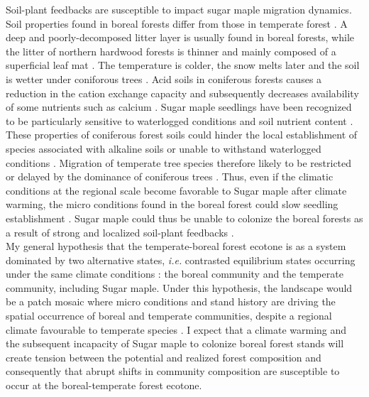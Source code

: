 Soil-plant feedbacks are susceptible to impact sugar maple migration dynamics.
Soil properties found in boreal forests differ from those in temperate forest
\cite{Lafleur2010,Barras1998,Goldblum2010,Demers1998}. A deep and poorly-decomposed
 litter layer is usually found in boreal forests, while the litter
of  northern hardwood forests is thinner and mainly composed of a superficial
leaf mat \cite{Barras1998}. The temperature is colder, the snow melts later
and the soil is wetter under coniforous trees \cite{Lafleur2010,Goldblum2010}.
Acid soils in coniferous forests causes a reduction in the cation exchange
capacity and subsequently decreases availability of some nutrients such as
calcium \cite{Moore2008}. Sugar maple seedlings have been recognized to be
particularly sensitive to waterlogged conditions and soil nutrient content
\cite{Moore2008,Lafleur2010,Cleavitt2011}. These properties of coniferous
forest soils could hinder the local establishment of species associated with
alkaline soils or unable to withstand waterlogged conditions
\cite{Lafleur2010}. Migration of temperate tree species therefore likely to be
restricted or delayed by the dominance of coniferous trees \cite{Lafleur2010}.
Thus, even if the climatic conditions at the regional scale become favorable
to Sugar maple after climate warming, the micro conditions found in the boreal
forest could slow seedling establishment
\cite{Kellman2004,Moore2008,Barras1998,Messier2011}. Sugar maple could thus be
unable to colonize the boreal forests as a result of strong and localized
soil-plant feedbacks \cite{McCarthyNeumann2012}.\\

My general hypothesis that the temperate-boreal forest ecotone is as a system
dominated by two alternative states, \textit{i.e.} contrasted equilibrium
states occurring under the same climate conditions
\cite{scheffer2009critical}: the boreal community and the temperate community,
including Sugar maple. Under this hypothesis, the landscape would be a patch
mosaic where micro conditions and stand history are driving the spatial
occurrence of boreal and temperate communities, despite a regional climate
favourable to temperate species \cite{Goldblum2010,Fisichelli2013}. I expect
that a climate warming and the subsequent incapacity of Sugar maple to
colonize boreal forest stands will create  tension between the potential and
realized forest composition and consequently that abrupt shifts in community
composition are susceptible to occur at the boreal-temperate forest ecotone.\\

